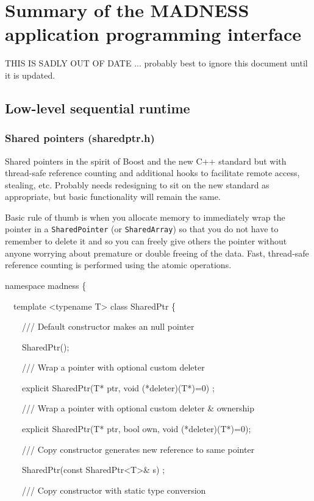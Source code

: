 \documentclass[letterpaper]{article}
\title{}
\author{Robert Harrison}
\date{2009-12-14}
\begin{document}
\section*{Summary of the MADNESS application programming interface}
THIS IS SADLY OUT OF DATE ... probably best to ignore this document until it is updated.

\subsection{Low-level sequential runtime}
\subsubsection{Shared pointers (sharedptr.h)}
Shared pointers in the spirit of Boost and the new C++ standard but with thread-safe reference counting and additional
hooks to facilitate remote access, stealing, etc. Probably needs redesigning to sit on the new standard as appropriate,
but basic functionality will remain the same.

Basic rule of thumb is when you allocate memory to immediately wrap the pointer in a \texttt{SharedPointer} (or
\texttt{SharedArray}) so that you do not have to remember to delete it and so you can freely give others the pointer
without anyone worrying about premature or double freeing of the data. Fast, thread-safe reference counting is
performed using the atomic operations.

{\ttfamily
namespace madness \{}

{\ttfamily
\ \ template {\textless}typename T{\textgreater} class SharedPtr \{}

{\ttfamily
\ \ \ \ /// Default constructor makes an null pointer}

{\ttfamily
\ \ \ \ SharedPtr(); }

{\ttfamily
\ \ \ \ /// Wrap a pointer with optional custom deleter}

{\ttfamily
\ \ \ \ explicit SharedPtr(T* ptr, void (*deleter)(T*)=0) ;}

{\ttfamily
\ \ \ \ /// Wrap a pointer with optional custom deleter \& ownership}

{\ttfamily
\ \ \ \ explicit SharedPtr(T* ptr, bool own, void (*deleter)(T*)=0);}

{\ttfamily
\ \ \ \ /// Copy constructor generates new reference to same pointer}

{\ttfamily
\ \ \ \ SharedPtr(const SharedPtr{\textless}T{\textgreater}\& s) ;}

{\ttfamily
\ \ \ \ /// Copy constructor with static type conversion}
\end{document}
